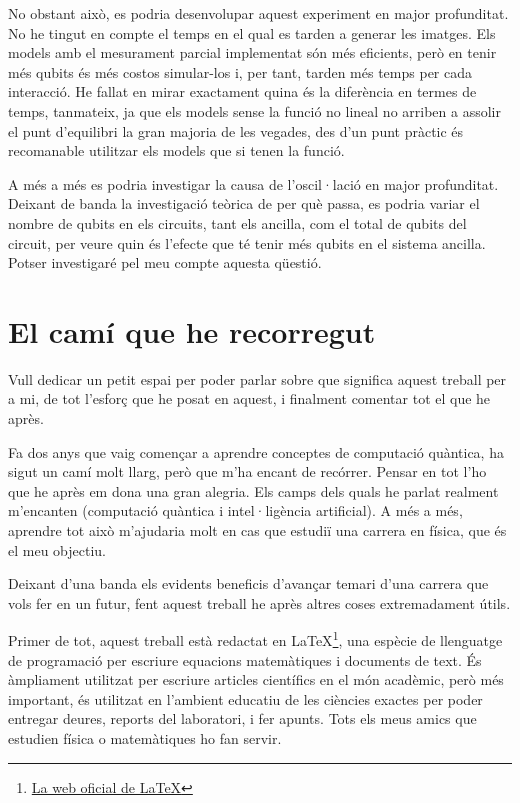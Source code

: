 No obstant això, es podria desenvolupar aquest experiment en major profunditat. No he tingut en compte el temps en el qual es tarden a generar les imatges. Els models amb el mesurament parcial implementat són més eficients, però en tenir més qubits és més costos simular-los i, per tant, tarden més temps per cada interacció. He fallat en mirar exactament quina és la diferència en termes de temps, tanmateix, ja que els models sense la funció no lineal no arriben a assolir el punt d'equilibri la gran majoria de les vegades, des d'un punt pràctic és recomanable utilitzar els models que si tenen la funció. 

A més a més es podria investigar la causa de l'oscil·lació en major profunditat. Deixant de banda la investigació teòrica de per què passa, es podria variar el nombre de qubits en els circuits, tant els ancilla, com el total de qubits del circuit, per veure quin és l'efecte que té tenir més qubits en el sistema ancilla. Potser investigaré pel meu compte aquesta qüestió. 

\section*{El camí que he recorregut}
Vull dedicar un petit espai per poder parlar sobre que significa aquest treball per a mi, de tot l'esforç que he posat en aquest, i finalment comentar tot el que he après.

Fa dos anys que vaig començar a aprendre conceptes de computació quàntica, ha sigut un camí molt llarg, però que m'ha encant de recórrer. Pensar en tot l'ho que he après em dona una gran alegria. Els camps dels quals he parlat realment m'encanten (computació quàntica i intel·ligència artificial). A més a més, aprendre tot això m'ajudaria molt en cas que estudiï una carrera en física, que és el meu objectiu.

Deixant d'una banda els evidents beneficis d'avançar temari d'una carrera que vols fer en un futur, fent aquest treball he après altres coses extremadament útils.

Primer de tot, aquest treball està redactat en \LaTeX\footnote{\href{https://www.latex-project.org/}{La web oficial de \LaTeX}}, una espècie de llenguatge de programació per escriure equacions matemàtiques i documents de text. És àmpliament utilitzat per escriure articles científics en el món acadèmic, però més important, és utilitzat en l'ambient educatiu de les ciències exactes per poder entregar deures, reports del laboratori, i fer apunts. Tots els meus amics que estudien física o matemàtiques ho fan servir.

